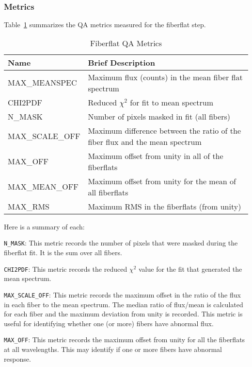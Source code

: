 \documentclass[12pt]{article}
\begin{document}
\subsubsection{Metrics}


Table~\ref{tab:flat_metrics} summarizes the QA metrics measured
for the fiberflat step.  

\begin{table}[h]
\begin{center}
\caption{Fiberflat QA Metrics}
\label{tab:flat_metrics}
\begin{tabular}{p{3.5cm}p{9.0cm}}
\hline
{\bf Name} & {\bf Brief Description}\\
\hline
MAX\_MEANSPEC   & Maximum flux (counts) in the mean fiber flat spectrum \\ 
CHI2PDF         & Reduced $\chi^2$ for fit to mean spectrum \\
N\_MASK         & Number of pixels masked in fit (all fibers) \\
MAX\_SCALE\_OFF & Maximum difference between the ratio of the fiber flux and 
  the mean spectrum \\
MAX\_OFF        & Maximum offset from unity in all of the fiberflats \\
MAX\_MEAN\_OFF  & Maximum offset from unity for the mean of all fiberflats \\
MAX\_RMS        & Maximum RMS in the fiberflats (from unity) \\
\hline
\end{tabular}
\end{center}
\end{table}


\noindent
Here is a summary of each:

\noindent
{\tt N\_MASK}:  This metric records the number of pixels that were
masked during the fiberflat fit.  It is the sum over all fibers.

\noindent
{\tt CHI2PDF}:  This metric records the reduced $\chi^2$ value 
for the fit that generated the mean spectrum.

\noindent
{\tt MAX\_SCALE\_OFF}:  This metric records the maximum offset 
in the ratio of the flux in each fiber to the mean spectrum.
The median ratio of flux/mean
is calculated for each fiber and the maximum
deviation from unity is recorded.  This metric is useful for
identifying whether one (or more) fibers have abnormal flux.

\noindent
{\tt MAX\_OFF}:  This metric records the maximum offset from
unity for all the fiberflats at all wavelengths.  
This may identify if one or more fibers have abnormal response.
\end{document}
